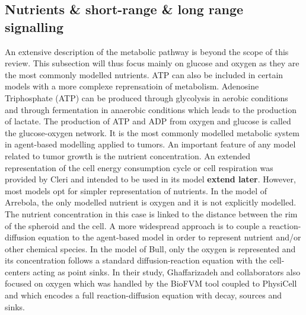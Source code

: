 \documentclass[11pt,a4paper]{article}
\begin{document}
\subsection{Nutrients \& short-range \& long range signalling}
An extensive description of the metabolic pathway is beyond the scope of this review. This subsection will thus focus mainly on glucose and oxygen as they are the most commonly modelled nutrients. ATP can also be included in certain models with a more complexe reprensatioin of metabolism.  Adenosine Triphosphate (ATP) can be produced through glycolysis in aerobic conditions and through fermentation in anaerobic conditions which leads to the production of lactate. The production of ATP and ADP from oxygen and glucose is called the glucose-oxygen network. It is the most commonly modelled metabolic system in agent-based modelling applied to tumors. 
An important feature of any model related to tumor growth is the nutrient concentration. An extended representation of the cell energy consumption cycle or cell respiration was provided by Cleri and intended to be used in its model \textbf{extend later}.\cite{Cleri2019} However, most models opt for simpler representation of nutrients.  In the model of Arrebola, the only modelled nutrient is oxygen and it is not explicitly modelled.\cite{Arrebola2020} The nutrient concentration in this case is linked to the distance between the rim of the spheroid and the cell. A more widespread approach is to couple a reaction-diffusion equation to the agent-based model in order to represent nutrient and/or other chemical species. In the model of Bull, only the oxygen is represented and its concentration follows a standard diffusion-reaction equation with the cell-centers acting as point sinks.\cite{Bull2020} In their study, Ghaffarizadeh and collaborators also focused on oxygen which was handled by the BioFVM tool coupled to PhysiCell and which encodes a full reaction-diffusion equation with decay, sources and sinks.\cite{Ghaffarizadeh2017}
\end{document}
